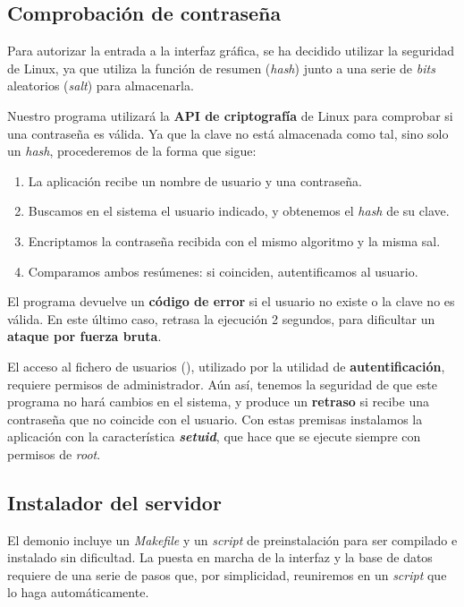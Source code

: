 \smallskip

\subsection{Comprobación de contraseña}
\label{subsec:aux_login}

Para autorizar la entrada a la interfaz gráfica, se ha decidido utilizar la seguridad de Linux, ya que utiliza la función de resumen (\textit{hash}) junto a una serie de \textit{bits} aleatorios (\textit{salt}) para almacenarla.

Nuestro programa utilizará la \textbf{\acrshort{API} de criptografía} de Linux para comprobar si una contraseña es válida. Ya que la clave no está almacenada como tal, sino solo un \textit{hash}, procederemos de la forma que sigue:

\begin{enumerate}
	\item La aplicación recibe un nombre de usuario y una contraseña.
	\item Buscamos en el sistema el usuario indicado, y obtenemos el \textit{hash} de su clave.
	\item Encriptamos la contraseña recibida con el mismo algoritmo y la misma sal.
	\item Comparamos ambos resúmenes: si coinciden, autentificamos al usuario.
\end{enumerate}

El programa devuelve un \textbf{código de error} si el usuario no existe o la clave no es válida. En este último caso, retrasa la ejecución 2 segundos, para dificultar un \textbf{ataque por fuerza bruta}.

El acceso al fichero de usuarios (), utilizado por la utilidad de \textbf{autentificación}, requiere permisos de administrador. Aún así, tenemos la seguridad de que este programa no hará cambios en el sistema, y produce un \textbf{retraso} si recibe una contraseña que no coincide con el usuario. Con estas premisas instalamos la aplicación con la característica \textbf{\textit{setuid}}, que hace que se ejecute siempre con permisos de \textit{root}.

\subsection{Instalador del servidor}

El demonio incluye un \textit{Makefile} y un \textit{script} de preinstalación para ser compilado e instalado sin dificultad. La puesta en marcha de la interfaz y la base de datos requiere de una serie de pasos que, por simplicidad, reuniremos en un \textit{script} que lo haga automáticamente.


